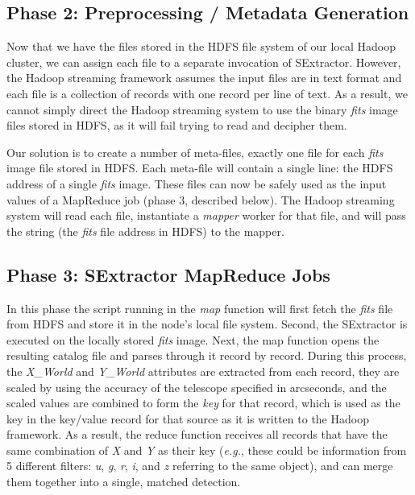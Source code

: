 \subsection{Phase 2: Preprocessing / Metadata Generation}
Now that we have the files stored in the HDFS file system of our local Hadoop cluster, we can assign each file to a separate invocation of SExtractor. However, the Hadoop streaming framework assumes the input files are in text format and each file is a collection of records with one record per line of text. As a result, we cannot simply direct the Hadoop streaming system to use the binary \textit{fits} image files stored in HDFS, as it will fail trying to read and decipher them.

Our solution is to create a number of meta-files, exactly one file for each \textit{fits} image file stored in HDFS. Each meta-file will contain a single line: the HDFS address of a single \textit{fits} image. These files can now be safely used as the input values of a MapReduce job (phase 3, described below). The Hadoop streaming system will read each file, instantiate a \textit{mapper} worker for that file, and will pass the string (the \textit{fits} file address in HDFS) to the mapper. 

\subsection{Phase 3: SExtractor MapReduce Jobs}
In this phase the script running in the \textit{map} function will first fetch the \textit{fits} file from HDFS and store it in the node's local file system. Second, the SExtractor is executed on the locally stored \textit{fits} image. Next, the map function opens the resulting catalog file and parses through it record by record. During this process, the \textit{X\_World} and \textit{Y\_World} attributes are extracted from each record, they are scaled by using the accuracy of the telescope specified in arcseconds, and the scaled values are combined to form the \textit{key} for that record, which is used as the key in the key/value record for that source as it is written to the Hadoop framework. As a result, the reduce function receives all  records that have the same combination of \textit{X} and \textit{Y} as their key (\textit{e.g.}, these could be information from 5 different filters: \textit{u}, \textit{g}, \textit{r}, \textit{i}, and \textit{z} referring to the same object), and can merge them together into a single, matched detection.


